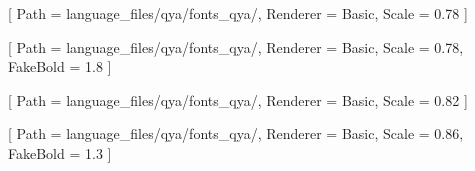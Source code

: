 %

[
  Path = language_files/qya/fonts_qya/,
  Renderer = Basic,
  Scale = 0.78
]

[
  Path = language_files/qya/fonts_qya/,
  Renderer = Basic,
  Scale = 0.78,
  FakeBold = 1.8
]

[
  Path = language_files/qya/fonts_qya/,
  Renderer = Basic,
  Scale = 0.82
]

[
  Path = language_files/qya/fonts_qya/,
  Renderer = Basic,
  Scale = 0.86,
  FakeBold = 1.3
]

